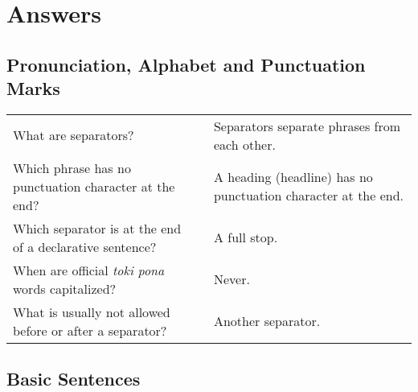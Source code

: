 
\section{Answers}
\subsection*{Pronunciation, Alphabet and Punctuation Marks}
\label{'pronunciation_alphabet_answers'}

\begin{supertabular}{p{5,5cm}|ll}
    What are separators?                                     &  & Separators separate phrases from each other.                  \\
    Which phrase has no punctuation character at the end?    &  & A heading (headline) has no punctuation character at the end. \\
    Which separator is at the end of a declarative sentence? &  & A full stop.                                                  \\
    When are official \textit{toki pona} words capitalized?  &  & Never.                                                        \\
    What is usually not allowed before or after a separator? &  & Another separator.                                            \\
\end{supertabular}

\newpage

\subsection*{Basic Sentences}
\label{'basic_sentences'}

